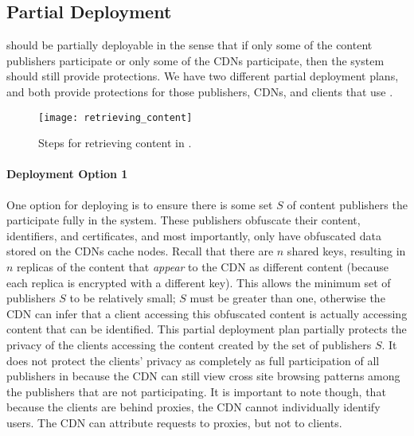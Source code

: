 \subsection{Partial Deployment}
\label{sec:partial}
\system{} should be partially deployable in the sense that if only some of the content publishers participate or only some of the CDNs participate, then 
the system should still provide protections.  We have two different partial deployment plans, and both provide protections for those 
publishers, CDNs, and clients that use \system{}. 

\begin{figure*}[t!]
\centering
\texttt{[image: retrieving\_content]}
\caption{Steps for retrieving content in \system{}.}
\label{fig:retrieving}
\end{figure*}

\paragraph{Deployment Option 1}
One option for deploying \system{} is to ensure there is some set $S$ of content publishers the participate fully in the 
system.  These publishers obfuscate their content, identifiers, and certificates, and most importantly, only have 
obfuscated data stored on the CDNs cache nodes.  Recall that there are $n$ shared keys, resulting in $n$ replicas of the 
content that {\it appear} to the CDN as different content (because each replica is encrypted with a different key).  This 
allows the minimum set of publishers $S$ to be relatively small; $S$ must be greater than one, otherwise the CDN can infer 
that a client accessing this obfuscated content is actually accessing content that can be identified.  This partial deployment plan 
partially protects the privacy of the clients accessing the content created by the set of publishers $S$.  It does not 
protect the clients' privacy as completely as full participation of all publishers in \system{} because the CDN can 
still view cross site browsing patterns among the publishers that are not participating. It is important to note though, that 
because the clients are behind proxies, the CDN cannot individually identify users.  The CDN can attribute requests to proxies, but 
not to clients.  

